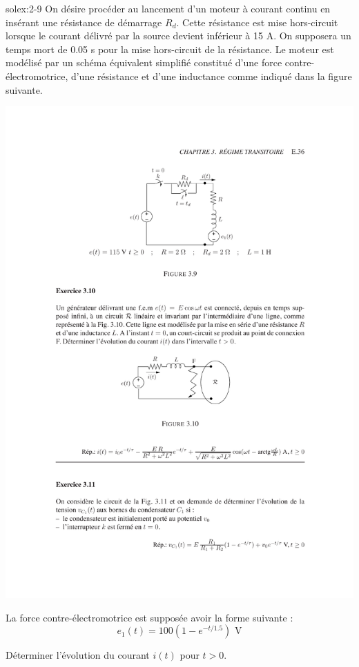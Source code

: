 \begin{exwithsol}{}{solex:2-9}
\label{ex:2-9}
On d\'esire proc\'eder au lancement d'un moteur \`a courant
continu en ins\'erant une r\'esistance de d\'emarrage $R_d$. Cette
r\'esistance est mise hors-circuit lorsque le courant d\'elivr\'e par la
source devient inf\'erieur \`a 15 A. On supposera un temps mort de 0.05 s
pour la mise hors-circuit de la r\'esistance. Le moteur est mod\'elis\'e par
un sch\'ema \'equivalent simplifi\'e constitu\'e d'une force
contre-\'electromotrice, d'une r\'esistance et d'une  inductance comme
indiqu\'e dans la figure suivante.
\begin{center}
	\includegraphics[width=0.9\linewidth]{exercices/ex-3-9}
\end{center}
La force contre-\'electromotrice est suppos\'ee avoir la forme suivante :
\[e_1(t)=100(1-e^{-t/1.5})\,\, \mbox{V}\]

D\'eterminer l'\'evolution du courant $i(t)$ pour $t>0$.

\end{exwithsol}

